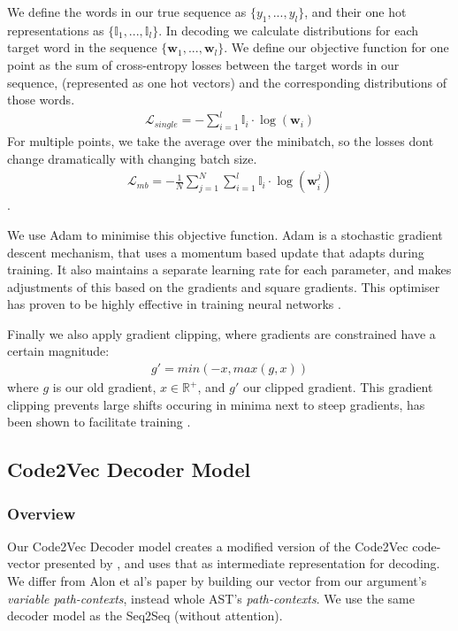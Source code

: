 We define the words in our true sequence as $\{y_1, ..., y_l\}$, and their one hot representations as $\{\mathbb{I}_1, ...,\mathbb{I}_l \}$.
In decoding we calculate distributions for each target word in the sequence $\{\mathbf{w}_1, ..., \mathbf{w}_l\}$.
We define our objective function for one point as the sum of cross-entropy losses between the target words in our sequence, (represented as one hot vectors) and the corresponding distributions of those words.
\begin{align}
    \mathcal{L}_{single} = -\sum_{i=1}^l\mathbb{I}_i\cdotp\log(\mathbf{w}_i)
\end{align} 
For multiple points, we take the average over the minibatch, so the losses dont change dramatically with changing batch size.
\begin{align}
    \mathcal{L}_{mb} = -\frac{1}{N}\sum_{j=1}^N\sum_{i=1}^l\mathbb{I}_i\cdotp\log(\mathbf{w}_i^j)
\end{align}.

We use Adam \citep{kingma2014adam} to minimise this objective function. Adam is a stochastic gradient descent mechanism, that uses a momentum based update that adapts during training. It also maintains a separate learning rate for each parameter, and makes adjustments of this based on the gradients and square gradients. This optimiser has proven to be highly effective in training neural networks \citep{ruder_overview_2016}.

Finally we also apply gradient clipping, where gradients are constrained have a certain magnitude:
\begin{align}
     g' = min(-x,max(g, x))
\end{align}
where $g$ is our old gradient, $x \in \mathbb{R}^{+}$, and $g'$ our clipped gradient. This gradient clipping prevents large shifts occuring in minima next to steep gradients, has been shown to facilitate training \citep{pascanu_difficulty_2012}.

\subsection{Code2Vec Decoder Model} %
\label{sec:code2vec_decoder_model}

\subsubsection{Overview}

Our Code2Vec Decoder model creates a modified version of the Code2Vec code-vector presented by \citet{alon_code2vec_2018}, and uses that as intermediate representation for decoding. We differ from Alon et al's paper by building our vector from our argument's \textit{variable path-contexts}, instead whole AST's \textit{path-contexts}.
We use the same decoder model as the Seq2Seq (without attention).

